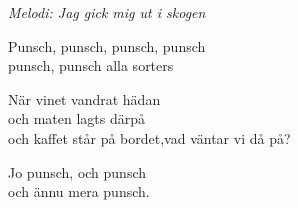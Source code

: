 {\footnotesize\textit{Melodi: Jag gick mig ut i skogen}}\par
\vspace{10pt}
\revrpt Punsch, punsch, punsch, punsch\\
punsch, punsch alla sorters\rpt\par
\vspace{10pt}
När vinet vandrat hädan\\
och maten lagts därpå\\
och kaffet står på bordet,vad väntar vi då på?\par
\vspace{10pt}
\revrpt Jo punsch, och punsch\\
och ännu mera punsch.\rpt
